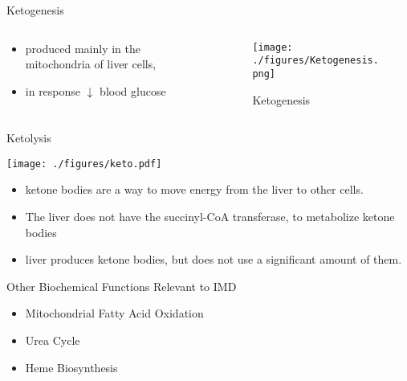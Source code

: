\documentclass[presentation, smaller]{beamer}
\begin{document}
\begin{frame}[label={sec:org910dc18}]{Ketogenesis}
\begin{columns}
\begin{column}{0.5\columnwidth}
\begin{itemize}
\item produced mainly in the mitochondria of liver cells,
\item in response \(\downarrow\) blood glucose
\end{itemize}
\end{column}

\begin{column}{0.5\columnwidth}
\begin{figure}[htbp]
\centering
\texttt{[image: ./figures/Ketogenesis.png]}
\caption[keto]{\label{fig:orge91861b}
Ketogenesis}
\end{figure}
\end{column}
\end{columns}
\end{frame}


\begin{frame}[label={sec:org4081fa5}]{Ketolysis}
\begin{center}
\texttt{[image: ./figures/keto.pdf]}
\end{center}

\begin{itemize}
\item ketone bodies are a way to move energy from the liver to other cells.
\item The liver does not have the succinyl-CoA transferase, to metabolize ketone bodies
\item liver produces ketone bodies, but does not use a significant amount of them.
\end{itemize}
\end{frame}

\begin{frame}[label={sec:org634c5cf}]{Other Biochemical Functions Relevant to IMD}
\begin{itemize}
\item Mitochondrial Fatty Acid Oxidation

\item Urea Cycle

\item Heme Biosynthesis
\end{itemize}
\end{frame}
\end{document}
